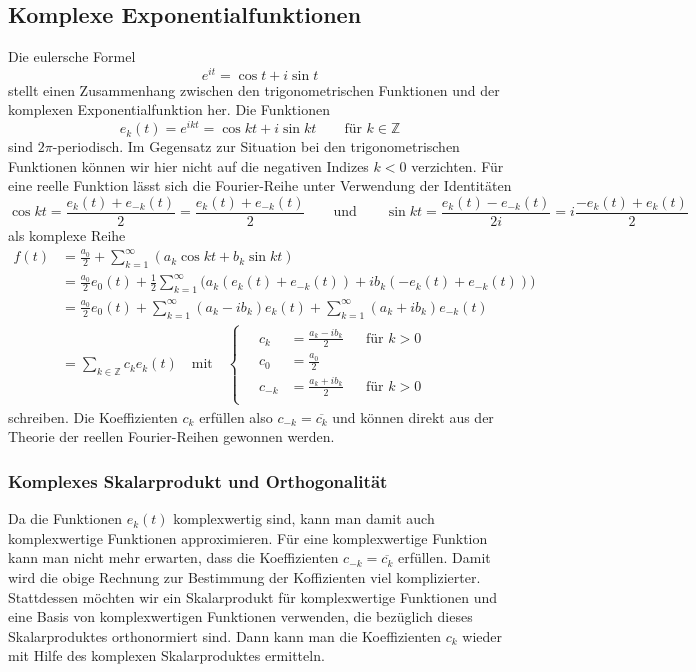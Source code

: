 \subsection{Komplexe Exponentialfunktionen}
Die eulersche Formel
\[
e^{it} = \cos t + i\sin t
\]
stellt einen Zusammenhang zwischen den trigonometrischen Funktionen
und der komplexen Exponentialfunktion her.
Die Funktionen
\[
e_k(t) = e^{ikt} = \cos kt + i\sin kt\qquad\text{für $k\in\mathbb{Z}$}
\]
sind $2\pi$-periodisch.
Im Gegensatz zur Situation bei den trigonometrischen Funktionen können
wir hier nicht auf die negativen Indizes $k<0$ verzichten.
Für eine reelle Funktion lässt sich die Fourier-Reihe unter Verwendung
der Identitäten
\[
\cos kt
=
\frac{e_k(t) + e_{-k}(t)}{2}
=
\frac{e_k(t) + e_{-k}(t)}2
\qquad\text{und}\qquad
\sin kt
=
\frac{e_k(t) - e_{-k}(t)}{2i}
=
i\frac{-e_{k}(t)+e_k(t)}2
\]
als komplexe Reihe 
\begin{align*}
f(t)
&=
\frac{a_0}2
+\sum_{k=1}^\infty (a_k\cos kt + b_k \sin kt)
\\
&=
\frac{a_0}2 e_0(t)
+
\frac12
\sum_{k=1}^\infty
\bigl(
a_k(e_k(t)+e_{-k}(t))
+
ib_k(-e_k(t)+e_{-k}(t))
\bigr)
\\
&=
\frac{a_0}2e_0(t)
+
\sum_{k=1}^\infty (a_k-ib_k)e_k(t)
+
\sum_{k=1}^\infty (a_k+ib_k)e_{-k}(t)
\\
&=\sum_{k\in\mathbb{Z}} c_ke_k(t)
\quad\text{mit}\quad
\left\{\quad
\begin{aligned}
c_k    &= \frac{a_k-ib_k}2&&\text{für $k>0$}\\
c_0    &= \frac{a_0}2     &&                \\
c_{-k} &= \frac{a_k+ib_k}2&&\text{für $k>0$}\\
\end{aligned}
\right.
\end{align*}
schreiben.
Die Koeffizienten $c_k$ erfüllen also $c_{-k}=\overline{c_k}$
und können direkt aus der Theorie der reellen Fourier-Reihen
gewonnen werden.

%
%
\subsubsection{Komplexes Skalarprodukt und Orthogonalität}
Da die Funktionen $e_k(t)$ komplexwertig sind, kann man damit
auch komplexwertige Funktionen approximieren. 
Für eine komplexwertige Funktion kann man nicht mehr erwarten, dass die
Koeffizienten $c_{-k}=\overline{c_k}$ erfüllen.
Damit wird die obige Rechnung zur Bestimmung der Koffizienten
viel komplizierter.
Stattdessen möchten wir ein Skalarprodukt für komplexwertige Funktionen
und eine Basis von komplexwertigen Funktionen verwenden, die 
bezüglich dieses Skalarproduktes orthonormiert sind.
Dann kann man die Koeffizienten $c_k$ wieder mit Hilfe des komplexen
Skalarproduktes ermitteln.


